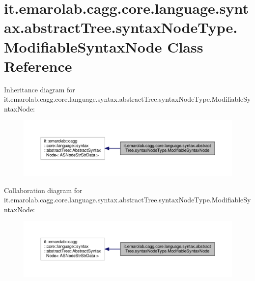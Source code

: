 \hypertarget{classit_1_1emarolab_1_1cagg_1_1core_1_1language_1_1syntax_1_1abstractTree_1_1syntaxNodeType_1_1ModifiableSyntaxNode}{\section{it.\-emarolab.\-cagg.\-core.\-language.\-syntax.\-abstract\-Tree.\-syntax\-Node\-Type.\-Modifiable\-Syntax\-Node Class Reference}
\label{classit_1_1emarolab_1_1cagg_1_1core_1_1language_1_1syntax_1_1abstractTree_1_1syntaxNodeType_1_1ModifiableSyntaxNode}
}


Inheritance diagram for it.\-emarolab.\-cagg.\-core.\-language.\-syntax.\-abstract\-Tree.\-syntax\-Node\-Type.\-Modifiable\-Syntax\-Node\-:\nopagebreak
\begin{figure}[H]
\begin{center}
\leavevmode
\includegraphics[width=350pt]{classit_1_1emarolab_1_1cagg_1_1core_1_1language_1_1syntax_1_1abstractTree_1_1syntaxNodeType_1_1Mc42153e6644aa7fe14090865ae6905fe}
\end{center}
\end{figure}


Collaboration diagram for it.\-emarolab.\-cagg.\-core.\-language.\-syntax.\-abstract\-Tree.\-syntax\-Node\-Type.\-Modifiable\-Syntax\-Node\-:\nopagebreak
\begin{figure}[H]
\begin{center}
\leavevmode
\includegraphics[width=350pt]{classit_1_1emarolab_1_1cagg_1_1core_1_1language_1_1syntax_1_1abstractTree_1_1syntaxNodeType_1_1M9055ca96d64503e9331c6db8b07af994}
\end{center}
\end{figure}
